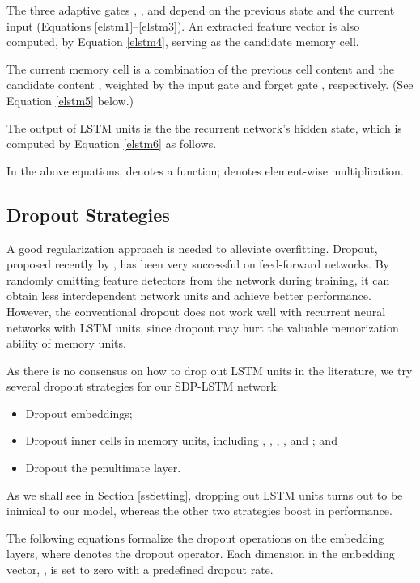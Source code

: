\documentclass[11pt,a4paper]{article}
\begin{document}
The three adaptive gates , , and 
depend on the previous state  and the current input 
(Equations \ref{elstm1}--\ref{elstm3}).
An extracted feature vector  is also computed, by Equation \ref{elstm4},
serving as the candidate memory cell.




The current memory cell  is a  combination of
the previous cell content  and the candidate content ,
weighted by the input gate  and forget gate , respectively.
(See Equation \ref{elstm5} below.)



The output of LSTM units is the the recurrent network's hidden state, which
is computed by Equation \ref{elstm6} as follows.


In the above equations,   denotes a  function;
 denotes element-wise multiplication.





\subsection{Dropout Strategies}\label{ssDropout}

A good regularization approach is needed to alleviate overfitting. Dropout, proposed recently by , 
has been very successful on feed-forward networks. By randomly omitting feature detectors from the network during training, it can obtain less interdependent network units and achieve better performance. However, the conventional dropout does not work well with recurrent neural networks with LSTM units, since dropout may hurt the valuable memorization ability of memory units.

As there is no consensus on how to drop out LSTM units in the literature,
we try several dropout strategies for our SDP-LSTM network:
\begin{itemize}
\item Dropout embeddings;
\item Dropout inner cells in memory units, including , , , , and ; and
\item Dropout the penultimate layer.
\end{itemize}
As we shall see in Section \ref{ssSetting},
dropping out LSTM units turns out to be inimical to our model, whereas
the other two strategies boost in performance.

The following equations formalize the dropout operations
on the embedding layers, where  denotes the dropout operator.
Each dimension in the embedding vector, , is set to zero with a predefined dropout rate.
\end{document}
